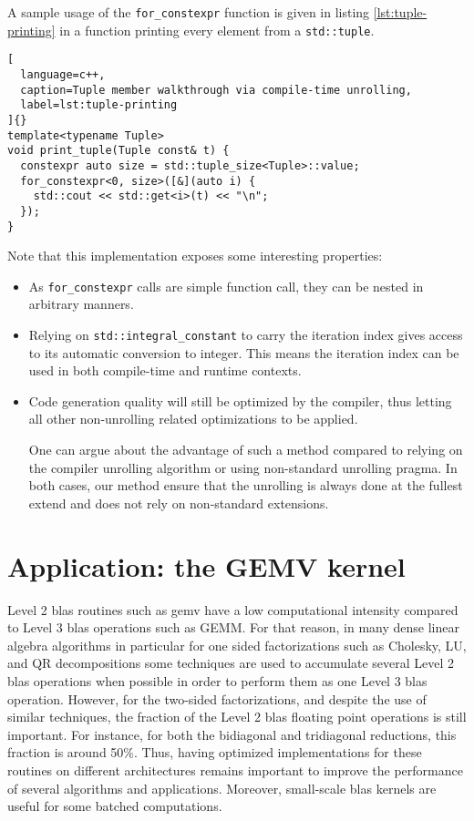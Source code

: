 \documentclass[../main]{subfiles}
\begin{document}
A sample usage of the \lstinline{for_constexpr} function is given
in listing \ref{lst:tuple-printing} in a function printing
every element from a \lstinline{std::tuple}.

\begin{lstlisting}[
  language=c++,
  caption=Tuple member walkthrough via compile-time unrolling,
  label=lst:tuple-printing
]{}
template<typename Tuple>
void print_tuple(Tuple const& t) {
  constexpr auto size = std::tuple_size<Tuple>::value;
  for_constexpr<0, size>([&](auto i) {
    std::cout << std::get<i>(t) << "\n";
  });
}
\end{lstlisting}

Note that this implementation exposes some interesting
properties:

\begin{itemize}
\item
As \lstinline{for_constexpr} calls are simple function call, they
can be nested in arbitrary manners.

\item
Relying on \lstinline{std::integral_constant} to carry the
iteration index gives access to its automatic conversion
to integer. This means the iteration index can be used in
both compile-time and runtime contexts.

\item
Code generation quality will still be optimized by the
compiler, thus letting all other non-unrolling related optimizations
to be applied.

One can argue about the advantage of such a method
compared to relying on the compiler unrolling algorithm
or using non-standard unrolling pragma. In both cases, our
method ensure that the unrolling is always done at the fullest
extend and does not rely on non-standard extensions.
\end{itemize}

\section{
  Application: the GEMV kernel
}

Level 2 \gls{blas} routines such as \gls{gemv} have a low
computational intensity compared to Level 3 \gls{blas} operations
such as GEMM. For that reason, in many dense linear algebra
algorithms in particular for one sided factorizations such as
Cholesky, LU, and QR decompositions some techniques are
used to accumulate several Level 2 \gls{blas} operations when
possible in order to perform them as one Level 3 \gls{blas}
operation\cite{hpcs18}. However, for the two-sided factorizations,
and despite the use of similar techniques, the fraction of the
Level 2 \gls{blas} floating point operations is still important. For
instance, for both the bidiagonal and tridiagonal reductions,
this fraction is around 50\%\cite{hpcs19}. Thus, having optimized
implementations for these routines on different architectures
remains important to improve the performance of several
algorithms and applications. Moreover, small-scale \gls{blas}
kernels are useful for some batched computations\cite{hpcs20}.
\end{document}
